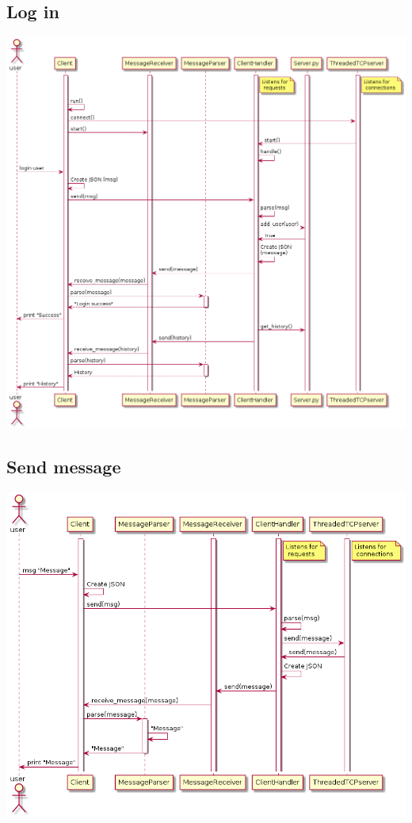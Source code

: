 \documentclass[11pt]{article}
\begin{document}
\subsection{Log in}
\label{sec-3-1}
\includegraphics[width=.9\linewidth]{sequence_login.png}

\subsection{Send message}
\label{sec-3-2}
\includegraphics[width=.9\linewidth]{sequence_msg.png}
\end{document}
